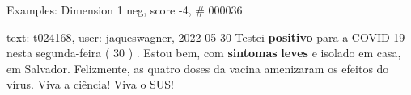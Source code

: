 \begin{frame}{Examples: Dimension 1 neg, score -4, \# 000036}
\footnotesize
\begin{alertblock}{text: t024168, user: jaqueswagner, 2022-05-30}
Testei \textbf{positivo} para a COVID-19 nesta segunda-feira ( 30 ) . Estou 
bem, com \textbf{sintomas} \textbf{leves} e isolado em casa, em Salvador. 
Felizmente, as quatro doses da vacina amenizaram os efeitos do vírus. Viva a 
ciência! Viva o SUS! 
\end{alertblock}
\end{frame}
